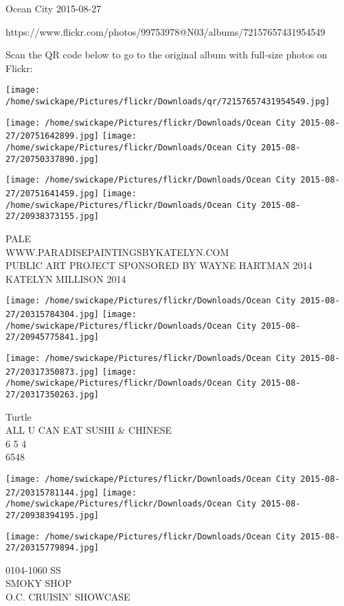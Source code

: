 \documentclass[10pt,letterpaper]{article}
\begin{document}
Ocean City 2015-08-27

https://www.flickr.com/photos/99753978@N03/albums/72157657431954549

Scan the QR code below to go to the original album with full-size photos on Flickr:

\texttt{[image: /home/swickape/Pictures/flickr/Downloads/qr/72157657431954549.jpg]}
\pagebreak

\texttt{[image: /home/swickape/Pictures/flickr/Downloads/Ocean City 2015-08-27/20751642899.jpg]}
\texttt{[image: /home/swickape/Pictures/flickr/Downloads/Ocean City 2015-08-27/20750337890.jpg]}

\texttt{[image: /home/swickape/Pictures/flickr/Downloads/Ocean City 2015-08-27/20751641459.jpg]}
\texttt{[image: /home/swickape/Pictures/flickr/Downloads/Ocean City 2015-08-27/20938373155.jpg]}

PALE\\
WWW.PARADISEPAINTINGSBYKATELYN.COM\\
PUBLIC ART PROJECT SPONSORED BY WAYNE HARTMAN 2014\\
KATELYN MILLISON 2014
\pagebreak

\texttt{[image: /home/swickape/Pictures/flickr/Downloads/Ocean City 2015-08-27/20315784304.jpg]}
\texttt{[image: /home/swickape/Pictures/flickr/Downloads/Ocean City 2015-08-27/20945775841.jpg]}

\texttt{[image: /home/swickape/Pictures/flickr/Downloads/Ocean City 2015-08-27/20317350873.jpg]}
\texttt{[image: /home/swickape/Pictures/flickr/Downloads/Ocean City 2015-08-27/20317350263.jpg]}

Turtle\\
ALL U CAN EAT SUSHI \& CHINESE\\
6 5 4\\
6548
\pagebreak

\texttt{[image: /home/swickape/Pictures/flickr/Downloads/Ocean City 2015-08-27/20315781144.jpg]}
\texttt{[image: /home/swickape/Pictures/flickr/Downloads/Ocean City 2015-08-27/20938394195.jpg]}

\vspace{0.25in}
\texttt{[image: /home/swickape/Pictures/flickr/Downloads/Ocean City 2015-08-27/20315779894.jpg]}

0104{-}1060 SS\\
SMOKY SHOP\\
O.C. CRUISIN' SHOWCASE
\pagebreak
\end{document}
